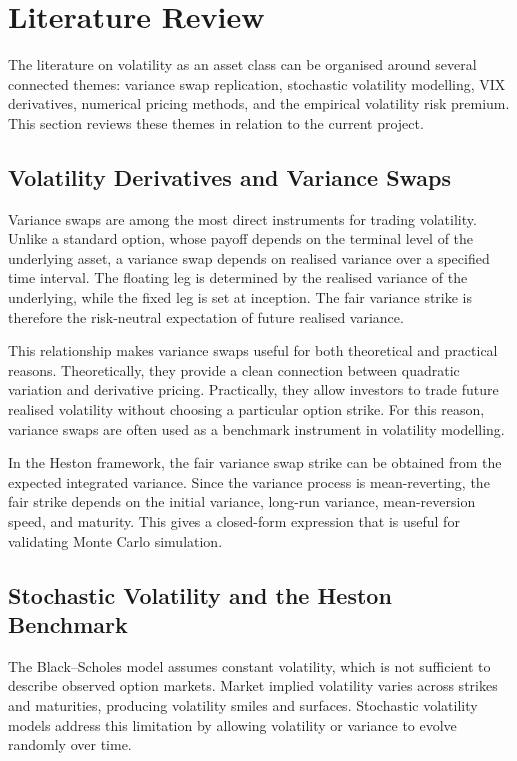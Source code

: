 \section{Literature Review}
\label{sec:literature_review}

The literature on volatility as an asset class can be organised around several connected themes: variance swap replication, stochastic volatility modelling, VIX derivatives, numerical pricing methods, and the empirical volatility risk premium. This section reviews these themes in relation to the current project.

\subsection{Volatility Derivatives and Variance Swaps}

Variance swaps are among the most direct instruments for trading volatility. Unlike a standard option, whose payoff depends on the terminal level of the underlying asset, a variance swap depends on realised variance over a specified time interval. The floating leg is determined by the realised variance of the underlying, while the fixed leg is set at inception. The fair variance strike is therefore the risk-neutral expectation of future realised variance.

This relationship makes variance swaps useful for both theoretical and practical reasons. Theoretically, they provide a clean connection between quadratic variation and derivative pricing. Practically, they allow investors to trade future realised volatility without choosing a particular option strike. For this reason, variance swaps are often used as a benchmark instrument in volatility modelling.

In the Heston framework, the fair variance swap strike can be obtained from the expected integrated variance. Since the variance process is mean-reverting, the fair strike depends on the initial variance, long-run variance, mean-reversion speed, and maturity. This gives a closed-form expression that is useful for validating Monte Carlo simulation.

\subsection{Stochastic Volatility and the Heston Benchmark}

The Black--Scholes model assumes constant volatility, which is not sufficient to describe observed option markets. Market implied volatility varies across strikes and maturities, producing volatility smiles and surfaces. Stochastic volatility models address this limitation by allowing volatility or variance to evolve randomly over time.

